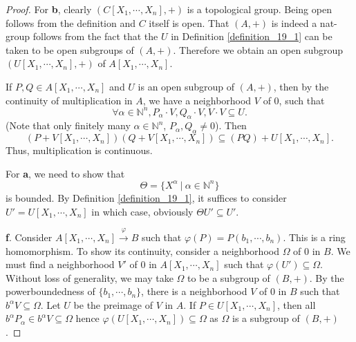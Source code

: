 \documentclass[10pt]{article}
\numberwithin{equation}{section}
\theoremstyle{definition}
\newcommand{\N}[0]{\mathbb{N}}
\newcommand{\sep}[0]{\:|\:}
\begin{document}
\begin{proof}
    For \textbf{b}, clearly $(C[X_1,\cdots,X_n],+)$ is a topological group. Being open follows from the definition and $C$ itself is open.
    That $(A,+)$ is indeed a nat-group follows from the fact that the $U$ in Definition \ref{definition_19_1} can be taken to be open subgroups of $(A,+)$. Therefore we obtain an open subgroup $(U[X_1,\cdots,X_n],+)$ of $A[X_1,\cdots,X_n]$.
    \par If $P,Q\in A[X_1,\cdots,X_n]$ and $U$ is an open subgroup of $(A,+)$, then by the continuity of multiplication in $A$, we have a neighborhood $V$ of $0$, such that
    \begin{equation*}
        \forall \alpha\in\N^n, P_\alpha\cdot V,Q_\alpha\cdot V, V\cdot V\subseteq U.
    \end{equation*}
    (Note that only finitely many $\alpha\in\N^n$, $P_\alpha,Q_\alpha\not=0$). Then
    \begin{equation*}
        (P+V[X_1,\cdots,X_n])(Q+V[X_1,\cdots,X_n])\subseteq (PQ)+U[X_1,\cdots,X_n].
    \end{equation*}
    Thus, multiplication is continuous.
    \par For \textbf{a}, we need to show that
    \begin{equation*}
        \Theta = \{X^\alpha\sep \alpha\in\N^n\}
    \end{equation*}
    is bounded.
    By Definition \ref{definition_19_1}, it suffices to consider $U'=U[X_1,\cdots,X_n]$ in which case, obviously $\Theta U'\subseteq U'$.
    \par \textbf{f}. Consider $A[X_1,\cdots,X_n]\stackrel{\varphi}{\rightarrow}B$ such that $\varphi(P) = P(b_1,\cdots,b_n)$. This is a ring homomorphism. To show its continuity, consider a neighborhood $\Omega$ of $0$ in $B$. We must find a neighborhood $V'$ of $0$ in $A[X_1,\cdots,X_n]$ such that $\varphi(U')\subseteq\Omega$. Without loss of generality, we may take $\Omega$ to be a subgroup of $(B,+)$.
    By the powerboundedness of $\{b_1,\cdots,b_n\}$, there is a neighborhood $V$ of $0$ in $B$ such that $b^\alpha V\subseteq\Omega$. Let $U$ be the preimage of $V$ in $A$. If $P\in U[X_1,\cdots,X_n]$, then all $ b^\alpha P_\alpha\in b^\alpha V\subseteq\Omega$ hence $\varphi(U[X_1,\cdots,X_n])\subseteq\Omega$ as $\Omega$ is a subgroup of $(B,+)$.

\end{proof}
\end{document}
